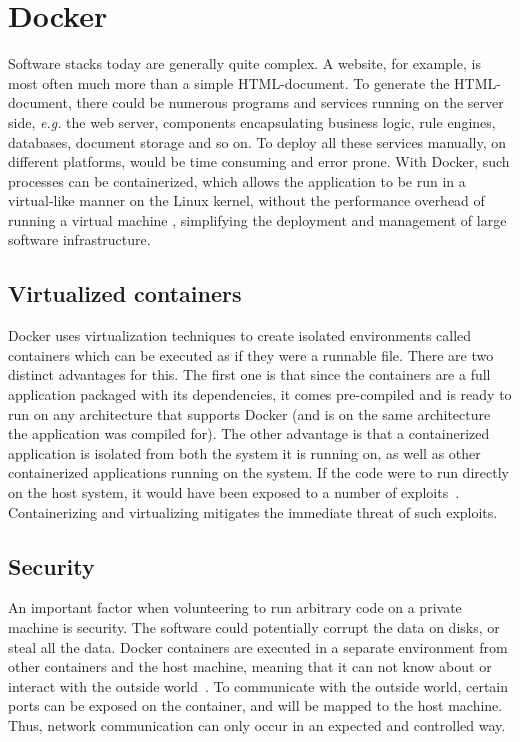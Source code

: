 \section{Docker}
Software stacks today are generally quite complex. A website, for example, is most often much more than a simple HTML-document. To generate the HTML-document, there could be numerous programs and services running on the server side, \textit{e.g.} the web server, components encapsulating business logic, rule engines, databases, document storage and so on. To deploy all these services manually, on different platforms, would be time consuming and error prone. With Docker, such processes can be containerized, which allows the application to be run in a virtual-like manner on the Linux kernel, without the performance overhead of running a virtual machine \cite{docker-about}, simplifying the deployment and management of large software infrastructure.

\subsection{Virtualized containers}
Docker uses virtualization techniques to create isolated environments called containers which can be executed as if they were a runnable file. There are two distinct advantages for this. The first one is that since the containers are a full application packaged with its dependencies, it comes pre-compiled and is ready to run on any architecture that supports Docker (and is on the same architecture the application was compiled for). The other advantage is that a containerized application is isolated from both the system it is running on, as well as other containerized applications running on the system. If the code were to run directly on the host system, it would have been exposed to a number of exploits~\cite{korpela:2012}. Containerizing and virtualizing mitigates the immediate threat of such exploits.

\subsection{Security}
An important factor when volunteering to run arbitrary code on a private machine is security. The software could potentially corrupt the data on disks, or steal all the data. 
Docker containers are executed in a separate environment from other containers and the host machine, meaning that it can not know about or interact with the outside world~\cite{docker-security}. To communicate with the outside world, certain ports can be exposed on the container, and will be mapped to the host machine. Thus, network communication can only occur in an expected and controlled way. 

